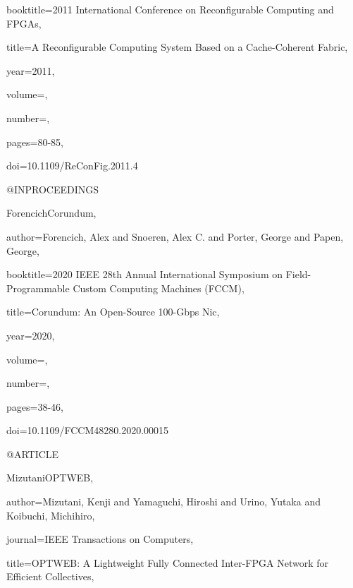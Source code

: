 {{  booktitle={2011 International Conference on Reconfigurable Computing and FPGAs}, 

  title={A Reconfigurable Computing System Based on a Cache-Coherent Fabric}, 

  year={2011},

  volume={},

  number={},

  pages={80-85},

  doi={10.1109/ReConFig.2011.4}}


@INPROCEEDINGS{ForencichCorundum,

  author={Forencich, Alex and Snoeren, Alex C. and Porter, George and Papen, George},

  booktitle={2020 IEEE 28th Annual International Symposium on Field-Programmable Custom Computing Machines (FCCM)}, 

  title={Corundum: An Open-Source 100-Gbps Nic}, 

  year={2020},

  volume={},

  number={},

  pages={38-46},

  doi={10.1109/FCCM48280.2020.00015}}


@ARTICLE{MizutaniOPTWEB,

  author={Mizutani, Kenji and Yamaguchi, Hiroshi and Urino, Yutaka and Koibuchi, Michihiro},

  journal={IEEE Transactions on Computers}, 

  title={OPTWEB: A Lightweight Fully Connected Inter-FPGA Network for Efficient Collectives}, 

}}
